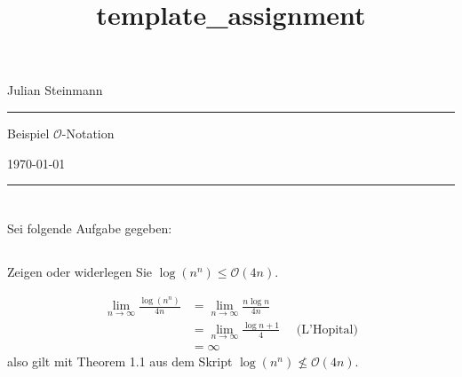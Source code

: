 \documentclass[a4paper,10pt]{article}
\begin{document}
  
  \title{template_assignment} %
  \fancyhead[C]{}
  \begin{minipage}{0.295\textwidth} %
    \raggedright
    Julian Steinmann 
    \medskip\hrule
  \end{minipage}
  \begin{minipage}{0.4\textwidth} %
    \centering 
    \large
    Beispiel \(\mathcal{O}\)-Notation \\ %
    \normalsize
  \end{minipage}
  \begin{minipage}{0.295\textwidth} %
    \raggedleft
    \today 
    \medskip\hrule
  \end{minipage}
  \section*{}

  Sei folgende Aufgabe gegeben: \\
  \subsection{}
  Zeigen oder widerlegen Sie \(\log(n^n) \le \mathcal{O}(4n)\).
  
  \begin{align*}
      \lim_{n\to \infty} \frac{\log(n^n)}{4n} &= \lim_{n\to \infty} \frac{n \log n}{4n} \\ &= \lim_{n\to\infty} \frac{\log n + 1}{4} \quad \text{ (L'Hopital)}\\ &= \infty
  \end{align*}
  also gilt mit Theorem 1.1 aus dem Skript \(\log(n^n) \nleq \mathcal{O}(4n)\).
  \bigskip
\end{document}

